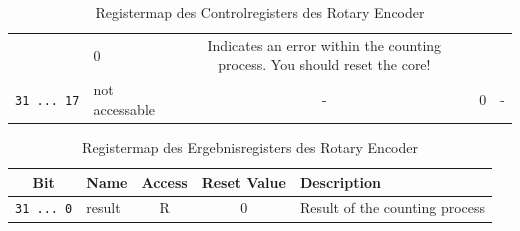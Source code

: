 \begin{table}
\begin{longtable}[]{@{}clccl@{}}
\begin{minipage}[t]{0.12\columnwidth}
							\end{minipage} & \begin{minipage}[t]{0.17\columnwidth}\centering\strut
							0\strut
							\end{minipage} & \begin{minipage}[t]{0.15\columnwidth}\raggedright\strut
							Indicates an error within the counting process. You should reset the
							core!\strut
							\end{minipage}\tabularnewline
							\begin{minipage}[t]{0.13\columnwidth}\centering\strut
								\texttt{31\ ...\ 17}\strut
								\end{minipage} & \begin{minipage}[t]{0.08\columnwidth}\raggedright\strut
								not accessable\strut
								\end{minipage} & \begin{minipage}[t]{0.12\columnwidth}\centering\strut
								-\strut
								\end{minipage} & \begin{minipage}[t]{0.17\columnwidth}\centering\strut
								0\strut
								\end{minipage} & \begin{minipage}[t]{0.15\columnwidth}\raggedright\strut
								-\strut
								\end{minipage}\tabularnewline

\end{longtable}
\caption{Registermap des Controlregisters des Rotary Encoder}
\label{hw:rotary:control}
\end{table}

\begin{table}
	\begin{longtable}[]{@{}clccl@{}}
		\textbf{Bit} & \textbf{Name} & \textbf{Access} & \textbf{Reset Value} &
		\textbf{Description}\tabularnewline
		\endhead
		\texttt{31\ ...\ 0} & result & R & 0 & Result of the counting
		process\tabularnewline
	\end{longtable}
	\caption{Registermap des Ergebnisregisters des Rotary Encoder}
	\label{hw:rotary:result}
\end{table}